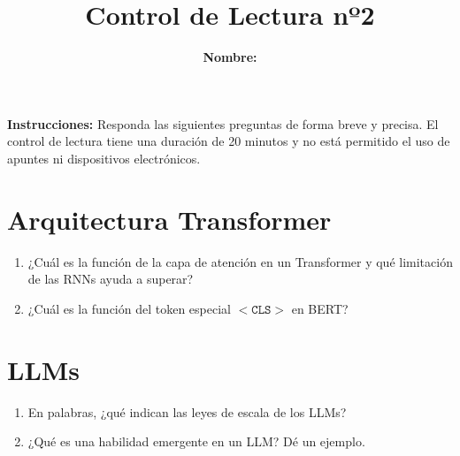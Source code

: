 \documentclass{article}
\title{\bfseries{Control de Lectura nº2}\vspace{0.5cm}}
\author{\textbf{Nombre:} \rule{12cm}{0.4pt}}
\begin{document}
\maketitle

\hspace{-0.5cm}\textbf{Instrucciones:} Responda las siguientes preguntas de forma breve y precisa. El control de lectura tiene una duración de 20 minutos y no está permitido el uso de apuntes ni dispositivos electrónicos.

\section*{Arquitectura Transformer}
\begin{enumerate}[{\bf P1.}]
	\item ¿Cuál es la función de la capa de atención en un Transformer y qué limitación de las RNNs ayuda a superar?
	\item ¿Cuál es la función del token especial $\mathtt{<CLS>}$ en BERT?
\end{enumerate}

\section*{LLMs}
\begin{enumerate}[{\bf P1.}]
	\item En palabras, ¿qué indican las leyes de escala de los LLMs?
	\item ¿Qué es una habilidad emergente en un LLM? Dé un ejemplo.
\end{enumerate}
\end{document}
